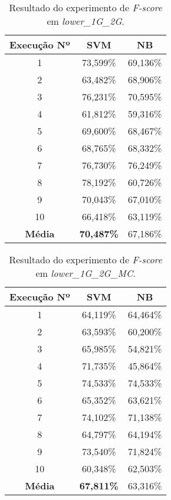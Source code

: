 \begin{table}[h]
    \centering
    \begin{tabular}{c c c}
        \hline
        {\bf Execução Nº} & {\bf SVM} & {\bf NB} \\
        \hline
        1 & 73,599\% & 69,136\% \\
        2 & 63,482\% & 68,906\% \\
        3 & 76,231\% & 70,595\% \\
        4 & 61,812\% & 59,316\% \\
        5 & 69,600\% & 68,467\% \\
        6 & 68,765\% & 68,332\% \\
        7 & 76,730\% & 76,249\% \\
        8 & 78,192\% & 60,726\% \\
        9 & 70,043\% & 67,010\% \\
        10 & 66,418\% & 63,119\% \\
        \hline
        {\bf Média} & {\bf 70,487\%} & 67,186\% \\
        \hline
    \end{tabular}
    \caption{Resultado do experimento de {\it F-score} em {\it lower\_1G\_2G}.}
    \label{tab:resultados-li-low-1g-2g}
\end{table}

\begin{table}[h]
    \centering
    \begin{tabular}{c c c}
        \hline
        {\bf Execução Nº} & {\bf SVM} & {\bf NB} \\
        \hline
        1 & 64,119\% & 64,464\% \\
        2 & 63,593\% & 60,200\% \\
        3 & 65,985\% & 54,821\% \\
        4 & 71,735\% & 45,864\% \\
        5 & 74,533\% & 74,533\% \\
        6 & 65,352\% & 63,621\% \\
        7 & 74,102\% & 71,138\% \\
        8 & 64,797\% & 64,194\% \\
        9 & 73,540\% & 71,824\% \\
        10 & 60,348\% & 62,503\% \\
        \hline
        {\bf Média} & {\bf 67,811\%} & 63,316\% \\
        \hline
    \end{tabular}
    \caption{Resultado do experimento de {\it F-score} em {\it lower\_1G\_2G\_MC}.}
    \label{tab:resultados-li-low-1g-2g-mc}
\end{table}

